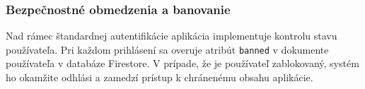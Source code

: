 \subsubsection{Bezpečnostné obmedzenia a banovanie}
Nad rámec štandardnej autentifikácie aplikácia implementuje kontrolu stavu používateľa. Pri každom prihlásení sa overuje atribút \texttt{banned} v dokumente používateľa v databáze Firestore. V prípade, že je používateľ zablokovaný, systém ho okamžite odhlási a zamedzí prístup k chránenému obsahu aplikácie.